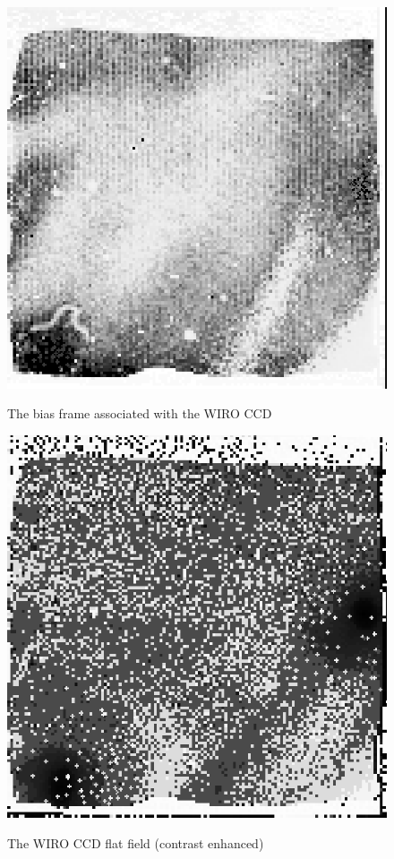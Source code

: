\documentclass[twoside,11pt]{article}
\begin{document}
\begin{figure}[htbp]
   \centering 
   \includegraphics[totalheight=3.5in]{sc5_m51_bias.ps}
   \begin{quote}
   \caption{The bias frame associated with the WIRO CCD
   \label{M51_BIAS} }
   \end{quote}
\end{figure}

\begin{figure}[htbp]
   \centering 
   \includegraphics[totalheight=3.5in]{sc5_m51_flat.ps}
   \begin{quote}
   \caption{The WIRO CCD flat field (contrast enhanced)
   \label{M51_FLAT} }
   \end{quote}
\end{figure}
\end{document}
